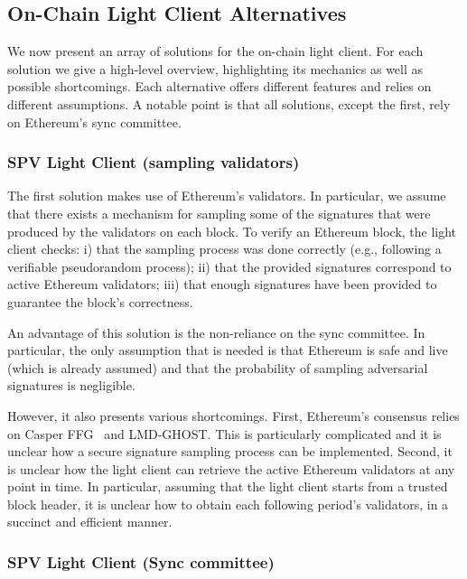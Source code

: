 \subsection{On-Chain Light Client Alternatives}\label{subsec:alternatives}

We now present an array of solutions for the on-chain light client. For each
solution we give a high-level overview, highlighting its mechanics as well as
possible shortcomings. Each alternative offers different features and relies on
different assumptions. A notable point is that all solutions, except the first,
rely on Ethereum's sync committee.

\subsubsection{SPV Light Client (sampling validators)}

The first solution makes use of Ethereum's validators. In particular, we assume
that there exists a mechanism for sampling some of the signatures that were
produced by the validators on each block. To verify an Ethereum block, the
light client checks:
i) that the sampling process was done correctly (e.g., following a verifiable pseudorandom process);
ii) that the provided signatures correspond to active Ethereum validators;
iii) that enough signatures have been provided to guarantee the block's correctness.

An advantage of this solution is the non-reliance on the sync committee. In
particular, the only assumption that is needed is that Ethereum is safe and
live (which is already assumed) and that the probability of sampling
adversarial signatures is negligible.

However, it also presents various shortcomings.
First, Ethereum's consensus relies on Casper FFG~\cite{buterin2017casper} and
LMD-GHOST. This is particularly complicated and it is unclear how a secure
signature sampling process can be implemented.
Second, it is unclear how the light client can retrieve the active Ethereum
validators at any point in time. In particular, assuming that the light client
starts from a trusted block header, it is unclear how to obtain each following
period's validators, in a succinct and efficient manner.

\subsubsection{SPV Light Client (Sync committee)}


